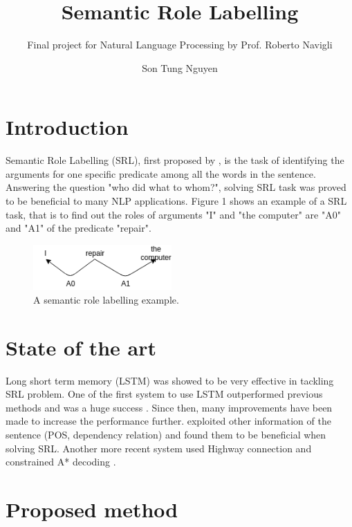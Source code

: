 \documentclass{scrartcl}
\begin{document}
\title{Semantic Role Labelling}
\subtitle{Final project for Natural Language
Processing by Prof. Roberto Navigli}
\author{Son Tung Nguyen}

\maketitle

\section{Introduction}
Semantic Role Labelling (SRL), first proposed by \cite{ARTICLE:2}, is the task of identifying
the arguments for one specific predicate among all the words in the sentence. Answering the
question "who did what to whom?", solving SRL task was proved to be beneficial to many NLP
applications. Figure 1 shows an example of a SRL task, that is to find out the roles of
arguments "I" and "the computer" are "A0" and "A1" of the predicate "repair".
\begin{figure}[h!]
\centering
\includegraphics[width=200]{figures/fig1.png}
\caption{A semantic role labelling example.}
\label{fig:srl}
\end{figure}

\section{State of the art}
Long short term memory (LSTM) was showed to be very effective in tackling SRL problem. One of the first system
to use LSTM outperformed previous methods and was a huge success \cite{ARTICLE:1}. Since then, many improvements
have been made to increase the performance further. \cite{ARTICLE:3} exploited other information of the sentence (POS, dependency
relation) and found them to be beneficial when solving SRL. Another more recent system used Highway connection
and constrained A* decoding \cite{ARTICLE:4}.
\section{Proposed method}
\end{document}
